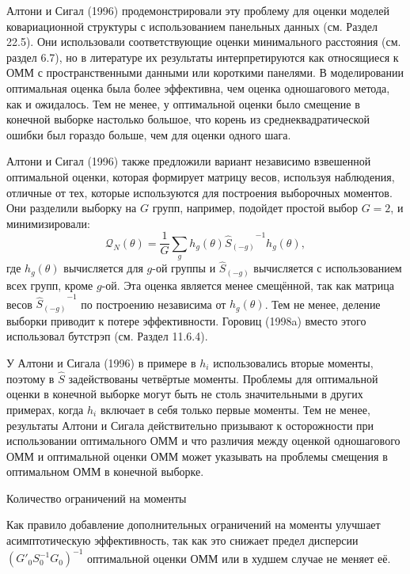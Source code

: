 Алтони и Сигал (1996) продемонстрировали эту проблему для оценки моделей ковариационной
структуры с использованием панельных данных (см. Раздел 22.5). Они использовали соответствующие оценки минимального расстояния (см. раздел 6.7), но в литературе их результаты интерпретируются как относящиеся к ОММ с пространственными данными или короткими панелями. В моделировании оптимальная оценка была более эффективна, чем оценка одношагового метода, как и ожидалось. Тем не менее, у оптимальной оценки было смещение в конечной выборке настолько большое, что корень из среднеквадратической ошибки был гораздо больше, чем для оценки одного шага.

Алтони и Сигал (1996) также предложили вариант независимо взвешенной оптимальной оценки, которая формирует матрицу весов, используя наблюдения, отличные от тех, которые используются для построения выборочных моментов. Они разделили выборку на $G$ групп, например, подойдет простой выбор $G=2$, и минимизировали:
\begin{equation}
\mathcal{Q}_{N}(\theta)= \frac{1}{G} \sum_g h_g(\theta) {\hat{S}_{(-g)}}^{-1} h_g(\theta),
\end{equation}
где $h_g(\theta)$ вычисляется для $g$-ой группы и $\hat{S}_{(-g)}$ вычисляется с использованием всех групп, кроме $g$-ой. Эта оценка является менее смещённой, так как матрица весов ${\hat{S}_{(-g)}}^{-1}$ по построению независима от $h_g(\theta)$. Тем не менее, деление выборки приводит к потере эффективности. Горовиц (1998a) вместо этого использовал бутстрэп (см. Раздел 11.6.4). 

У Алтони и Сигала (1996) в примере в $h_i$ использовались вторые моменты, поэтому в $\hat{S}$ задействованы четвёртые моменты. Проблемы для оптимальной оценки в конечной выборке могут быть не столь значительными в других примерах, когда $h_i$ включает в себя только первые моменты. Тем не менее, результаты Алтони и Сигала действительно призывают к осторожности при использовании оптимального ОММ и что различия между оценкой одношагового ОММ и оптимальной оценки ОММ может указывать на проблемы смещения в оптимальном ОММ в конечной выборке.

\begin{center}
Количество ограничений на моменты
\end{center}

Как правило добавление дополнительных ограничений на моменты улучшает асимптотическую эффективность, так как это снижает предел дисперсии $(G'_0 S^{-1}_0 G_0)^{-1}$ оптимальной оценки ОММ или в худшем случае не меняет её.

